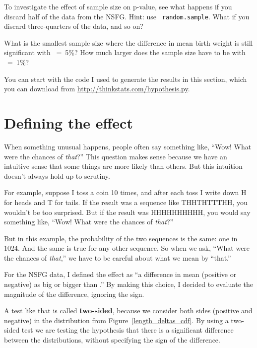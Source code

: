 \documentclass[12pt]{book}
\begin{document}
\begin{exercise}
To investigate the effect of sample size on p-value, see what happens
if you discard half of the data from the NSFG.  Hint: use {\tt
  random.sample}.  What if you discard three-quarters of the data, and
so on?

What is the smallest sample size where the difference in mean birth
weight is still significant with \myalpha~=~5\%?  How much
larger does the sample size have to be with \myalpha~=~1\%?

You can start with the code I used to generate the results in this
section, which you can download from \url{http://thinkstats.com/hypothesis.py}.

\end{exercise}


\section{Defining the effect}

When something unusual happens, people often say something like,
``Wow!  What were the chances of {\em that}?''  This question makes
sense because we have an intuitive sense that some things are more
likely than others.  But this intuition doesn't always hold up to
scrutiny.

For example, suppose I toss a coin 10 times, and after each toss I
write down H for heads and T for tails.  If the result was a sequence
like THHTHTTTHH, you wouldn't be too surprised.  But if the result was
HHHHHHHHHH, you would say something like, ``Wow!  What were the
chances of {\em that}?''

But in this example, the probability of the two sequences is the
same: one in 1024.  And the same is true for any other sequence.
So when we ask, ``What were the chances of {\em that},'' we have
to be careful about what we mean by ``that.''

For the NSFG data, I defined the effect as ``a difference in mean
(positive or negative) as big or bigger than \mydelta.''  By making
this choice, I decided to evaluate the magnitude of the difference,
ignoring the sign.

A test like that is called {\bf two-sided}, because we consider both
sides (positive and negative) in the distribution from
Figure~\ref{length_deltas_cdf}.  By using a two-sided test we are
testing the hypothesis that there is a significant difference between
the distributions, without specifying the sign of the difference.
\end{document}
